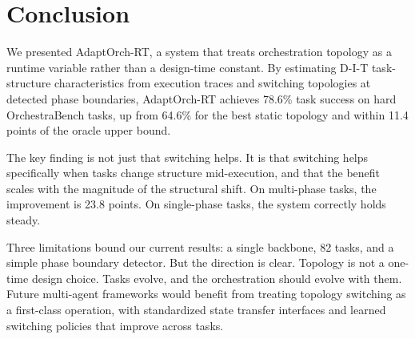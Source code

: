 \section{Conclusion}\label{conclusion}

We presented AdaptOrch-RT, a system that treats orchestration topology
as a runtime variable rather than a design-time constant. By estimating
D-I-T task-structure characteristics from execution traces and switching
topologies at detected phase boundaries, AdaptOrch-RT achieves 78.6\%
task success on hard OrchestraBench tasks, up from 64.6\% for the best
static topology and within 11.4 points of the oracle upper bound.

The key finding is not just that switching helps. It is that switching
helps specifically when tasks change structure mid-execution, and that
the benefit scales with the magnitude of the structural shift. On
multi-phase tasks, the improvement is 23.8 points. On single-phase
tasks, the system correctly holds steady.

Three limitations bound our current results: a single backbone, 82
tasks, and a simple phase boundary detector. But the direction is clear.
Topology is not a one-time design choice. Tasks evolve, and the
orchestration should evolve with them. Future multi-agent frameworks
would benefit from treating topology switching as a first-class
operation, with standardized state transfer interfaces and learned
switching policies that improve across tasks.
